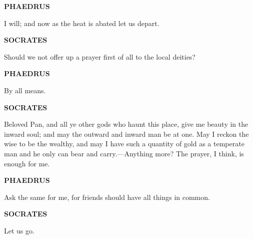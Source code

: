 \documentclass[11pt,letter]{article}
\begin{document}
\par \textbf{PHAEDRUS}
\par   I will; and now as the heat is abated let us depart.

\par \textbf{SOCRATES}
\par   Should we not offer up a prayer first of all to the local deities?

\par \textbf{PHAEDRUS}
\par   By all means.

\par \textbf{SOCRATES}
\par   Beloved Pan, and all ye other gods who haunt this place, give me beauty in the inward soul; and may the outward and inward man be at one. May I reckon the wise to be the wealthy, and may I have such a quantity of gold as a temperate man and he only can bear and carry.—Anything more? The prayer, I think, is enough for me.

\par \textbf{PHAEDRUS}
\par   Ask the same for me, for friends should have all things in common.

\par \textbf{SOCRATES}
\par   Let us go.

\par 
 
\end{document}
